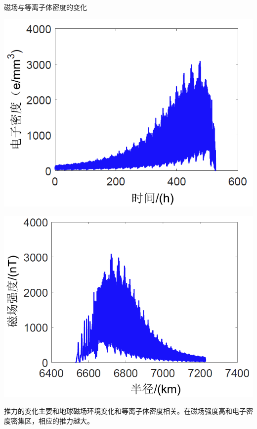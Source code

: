 \documentclass[sectioncirclenumberstyle]{le2iutbmbeamer}
\begin{document}
\begin{frame}{磁场与等离子体密度的变化}
\begin{minipage}{0.55\textwidth}
\begin{center}
\includegraphics[width=\linewidth]{figures/tng}
\end{center}
\end{minipage}%
\begin{minipage}{0.55\textwidth}
\centering
\includegraphics[width=\linewidth]{figures/tb}
\end{minipage}
推力的变化主要和地球磁场环境变化和等离子体密度相关。在磁场强度高和电子密度密集区，相应的推力越大。
\end{frame}
\end{document}
